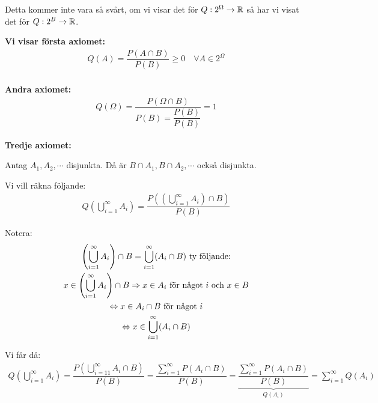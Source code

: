 \par\bigskip
\noindent Detta kommer inte vara så svårt, om vi visar det för $Q:2^\Omega\to\mathbb{R}$ så har vi visat det för $Q:2^B\to\mathbb{R}$.\par
\noindent\textbf{Vi visar första axiomet:} 
\begin{equation*}
  \begin{gathered}
    Q(A) = \dfrac{P(A\cap B)}{P(B)}\geq0\quad\forall A\in2^\Omega\\
  \end{gathered}
\end{equation*}
\par\bigskip
\noindent\textbf{Andra axiomet:} 
\begin{equation*}
  \begin{gathered}
    Q(\Omega) = \dfrac{P(\Omega\cap B)}{P(B) = \dfrac{P(B)}{P(B)}} = 1
  \end{gathered}
\end{equation*}
\par\bigskip
\noindent\textbf{Tredje axiomet:}\par
\noindent Antag $A_1, A_2,\cdots$ disjunkta. Då är $B\cap A_1, B\cap A_2,\cdots$ också disjunkta.\par
\noindent Vi vill räkna följande:
\begin{equation*}
  \begin{gathered}
    Q\left(\bigcup_{i=1}^{\infty}A_i\right) = \dfrac{P\left(\left(\bigcup_{i=1}^{\infty}A_i\right)\cap B\right)}{P(B)}
  \end{gathered}
\end{equation*}\par\bigskip
\noindent Notera:
\begin{equation*}
  \begin{gathered}
    \left(\bigcup_{i=1}^{\infty}A_i\right)\cap B = \bigcup_{i=1}^{\infty}(A_i\cap B)\text{ ty följande:}\\
    x\in \left(\bigcup_{i=1}^{\infty}A_i\right)\cap B\Rightarrow x\in A_i \text{ för något $i$ och $x\in B$}\\
    \Leftrightarrow x\in A_i\cap B\text{ för något $i$}\\
    \Leftrightarrow x\in \bigcup_{i=1}^{\infty}(A_i\cap B)
  \end{gathered}
\end{equation*}
\par\bigskip
\noindent Vi får då:
\begin{equation*}
  \begin{gathered}
    Q\left(\bigcup_{i=1}^{\infty}A_i\right) = \dfrac{P(\bigcup_{i=11}^{\infty}A_i\cap B)}{P(B)} = \dfrac{\sum_{i=1}^{\infty}P(A_i\cap B)}{P(B)} = \underbrace{\dfrac{\sum_{i=1}^{\infty}P(A_i\cap B)}{P(B)}}_{\text{$Q(A_i)$}} = \sum_{i=1}^{\infty}Q(A_i)
  \end{gathered}
\end{equation*}
